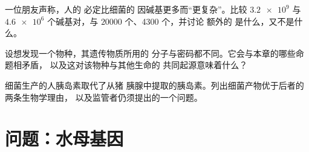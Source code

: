 \begin{exercise}[$\star\star\star$]\label{exo:g10:universal-dna:13}
一位朋友声称，人的  必定比细菌的 
因碱基更多而“更复杂”。比较 $\num{3.2e9}$ 与
$\num{4.6e6}$ 个碱基对，与 $\num{20000}$ 个、4300 个，并讨论
额外的  是什么，又不是什么。
\end{exercise}

\begin{exercise}[$\star\star\star$]\label{exo:g10:universal-dna:14}
设想发现一个物种，其遗传物质所用的
分子与密码都不同。它会与本章的哪些命题相矛盾，
以及这对该物种与其他生命的
共同起源意味着什么？
\end{exercise}

\begin{exercise}[$\star\star\star$]\label{exo:g10:universal-dna:15}
细菌生产的人胰岛素取代了从猪
胰腺中提取的胰岛素。列出细菌产物优于后者的两条生物学理由，
以及监管者仍须提出的一个问题。
\end{exercise}

\section{问题：水母基因}

